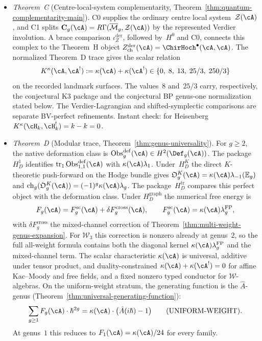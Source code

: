 \begin{itemize}
\item \emph{Theorem~C} (Centre-local-system complementarity,
 Theorem~\ref{thm:quantum-complementarity-main}).
 C0 supplies the ordinary centre local system~$\mathcal Z(\cA)$, and
 C1 splits
 $\mathbf C_g(\cA)=R\Gamma(\overline{\mathcal M}_g,\mathcal Z(\cA))$
 by the represented Verdier involution.  A brace comparison
 $\iota_Z^{\mathrm{der}}$, followed by~$H^0$ and C0, connects this
 complex to the Theorem~H object
 $Z^{\mathrm{der}}_{\mathrm{ch}}(\cA)=\ChirHoch^\bullet(\cA,\cA)$.
 The normalized Theorem~D trace gives the scalar relation
 \begin{equation}\label{eq:complementarity-intro}
 K^\kappa(\cA,\cA^!) :=
 \kappa(\cA)+\kappa(\cA^!)
 \in
 \{0,\;8,\;13,\;25/3,\;250/3\}
 \end{equation}
 on the recorded landmark surfaces. The values~$8$ and~$25/3$ carry,
 respectively, the conjectural K3 package and the conjectural BP
 genus-one normalization stated below. The Verdier-Lagrangian and
 shifted-symplectic comparisons are separate BV-perfect refinements.
 Instant check: for Heisenberg
 $K^\kappa(\cH_k,\cH_k^!)=k-k=0$.

\item \emph{Theorem~D} (Modular trace,
 Theorem~\ref{thm:genus-universality}).
 For $g\geq2$, the native deformation class is
 $\operatorname{Obs}^{\mathrm{def}}_g(\cA)\in H^2(\Def_g(\cA))$.
 The package~$H_D^1$ identifies
 $\operatorname{tr}_1\operatorname{Obs}^{\mathrm{def}}_{1,1}(\cA)$
 with $\kappa(\cA)\lambda_1$.  Under~$H_D^K$ the direct
 $K$-theoretic push-forward on the Hodge bundle gives
 $\mathfrak O_g^K(\cA)=\kappa(\cA)\lambda_{-1}(\mathbb E_g)$ and
 $\operatorname{ch}_g(\mathfrak O_g^K(\cA))=
 (-1)^g\kappa(\cA)\lambda_g$.  The package~$H_D^{\mathrm{tr}}$
 compares this perfect object with the deformation class.  Under
 $H_D^{\mathrm{graph}}$ the numerical free energy is
 \[
 F_g(\cA) = F_g^{\mathrm{sc}}(\cA)
 + \delta F_g^{\mathrm{cross}}(\cA),\qquad
 F_g^{\mathrm{sc}}(\cA)=\kappa(\cA)\lambda_g^{\mathrm{FP}},
 \]
 with $\delta F_g^{\mathrm{cross}}$ the mixed-channel correction of
 Theorem~\ref{thm:multi-weight-genus-expansion}. For
 $\mathcal{W}_3$ this correction is nonzero already at genus~$2$, so
 the full all-weight formula contains both the diagonal kernel
 $\kappa(\cA)\lambda_g^{\mathrm{FP}}$ and the mixed-channel term.
 The scalar characteristic \(\kappa(\cA)\) is universal,
 additive under tensor product, and duality-constrained
 \(\kappa(\cA)+\kappa(\cA^!)=0\) for affine Kac--Moody and free
 fields, and a fixed nonzero typed conductor for
 $\mathcal{W}$-algebras.
 On the uniform-weight stratum, the generating function is the
 $\hat{A}$-genus
 \textup{(}Theorem~\textup{\ref{thm:universal-generating-function}}\textup{)}:
 \begin{equation}\label{eq:ahat-genus-generating-function-intro}
 \sum_{g \geq 1} F_g(\cA) \cdot \hbar^{2g}
 = \kappa(\cA) \cdot \bigl(\hat{A}(i\hbar) - 1\bigr)
 \qquad \textup{(UNIFORM-WEIGHT)}.
 \end{equation}
 At genus~$1$ this reduces to $F_1(\cA) = \kappa(\cA)/24$ for every
 family.


\end{itemize}
